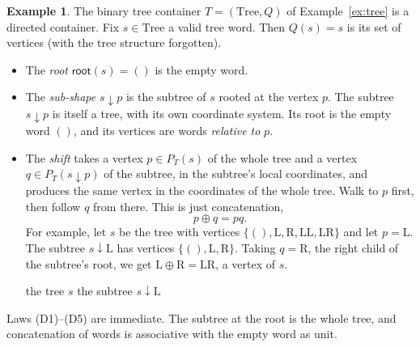 \documentclass[11pt, a4paper]{article}
\theoremstyle{definition}
\newtheorem{example}[definition]{Example}
\theoremstyle{plain}
\newcommand{\droot}{\mathsf{root}}
\newcommand{\dsub}{\mathbin{\downarrow}}
\newcommand{\dshift}{\mathbin{\oplus}}
\begin{document}
\noindent\colorbox{green!10}{\parbox{\dimexpr\linewidth-2\fboxsep}{%
\begin{example}
The binary tree container $T = (\mathrm{Tree}, Q)$ of
Example~\ref{ex:tree} is a directed
container.  Fix $s \in \mathrm{Tree}$ a valid tree word.  Then $Q(s) = s$ is its set
of vertices (with the tree structure forgotten).
\begin{itemize}
  \item The \emph{root} $\droot(s) = ()$ is the empty word.
  \item The \emph{sub-shape} $s \dsub p$ is the subtree of $s$ rooted at
    the vertex $p$.  The subtree $s \dsub p$ is itself a tree, with its own
    coordinate system.  Its root is the empty word $()$, and its vertices are
    words \emph{relative to} $p$.
  \item The \emph{shift} takes a vertex $p \in P_T(s)$ of the whole tree and
    a vertex $q \in P_T(s \dsub p)$ of the subtree, in the subtree's local
    coordinates, and produces the same vertex in the coordinates of the whole
    tree.  Walk to $p$ first, then follow $q$ from there.  This is just
    concatenation,
    \[
      p \dshift q = pq.
    \]
    For example, let $s$ be the tree with vertices
    $\{(), \mathrm{L}, \mathrm{R}, \mathrm{LL}, \mathrm{LR}\}$ and let
    $p = \mathrm{L}$.  The subtree $s \dsub \mathrm{L}$ has vertices
    $\{(), \mathrm{L}, \mathrm{R}\}$.  Taking $q = \mathrm{R}$,
    the right child of the subtree's root, we get
    $\mathrm{L} \dshift \mathrm{R} = \mathrm{LR}$, a vertex of $s$.
    \begin{center}
    \hspace{2cm}

    \smallskip
    the tree $s$ \hspace{3.2cm} the subtree $s \dsub \mathrm{L}$
    \end{center}
\end{itemize}
Laws (D1)--(D5) are immediate.  The subtree at the root
is the whole tree, and concatenation of words is associative with the empty
word as unit.
\end{example}%
}}
\end{document}
